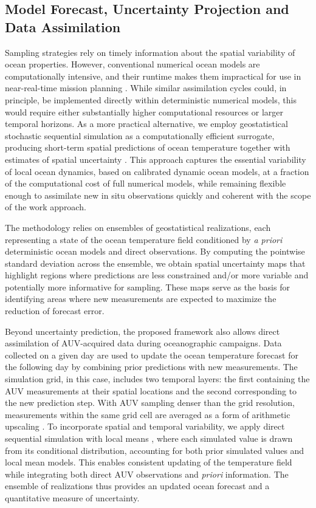 \subsection{Model Forecast, Uncertainty Projection and Data Assimilation}

Sampling strategies rely on timely information about the spatial
variability of ocean properties. However, conventional numerical ocean
models are computationally intensive, and their runtime makes them
impractical for use in near-real-time mission planning . While similar assimilation cycles could, in
principle, be implemented directly within deterministic numerical
models, this would require either substantially higher computational
resources or larger temporal horizons. As a more practical
alternative, we employ geostatistical stochastic sequential simulation
as a computationally efficient surrogate, producing short-term spatial
predictions of ocean temperature together with estimates of spatial
uncertainty \cite{deutsch1992}. This approach captures the essential
variability of local ocean dynamics, based on calibrated dynamic ocean
models, at a fraction of the computational cost of full numerical
models, while remaining flexible enough to assimilate new in situ
observations quickly \cite{Duarte2025} and coherent with the scope of
the work approach. 

The methodology relies on ensembles of geostatistical realizations,
each representing a state of the ocean temperature field conditioned
by \emph{a priori} deterministic ocean models \cite{CMEMS2017} and
direct observations. By computing the pointwise standard deviation
across the ensemble, we obtain spatial uncertainty maps that highlight
regions where predictions are less constrained and/or more variable
and potentially more informative for sampling. These maps serve as the
basis for identifying areas where new measurements are expected to
maximize the reduction of forecast error. 

Beyond uncertainty prediction, the proposed framework also allows
direct assimilation of AUV-acquired data during oceanographic
campaigns. Data collected on a given day are used to update the ocean
temperature forecast for the following day by combining prior
predictions with new measurements. The simulation grid, in this case,
includes two temporal layers: the first containing the AUV
measurements at their spatial locations and the second corresponding
to the new prediction step. With AUV sampling denser than the grid
resolution, measurements within the same grid cell are averaged as a
form of arithmetic upscaling \cite{Duarte2025}. To incorporate spatial
and temporal variability, we apply direct sequential simulation with
local means \cite{soares2001direct}, where each simulated value is
drawn from its conditional distribution, accounting for both prior
simulated values and local mean models. This enables consistent
updating of the temperature field while integrating both direct AUV
observations and \textit{priori} information. The ensemble of
realizations thus provides an updated ocean forecast and a
quantitative measure of uncertainty.
 

